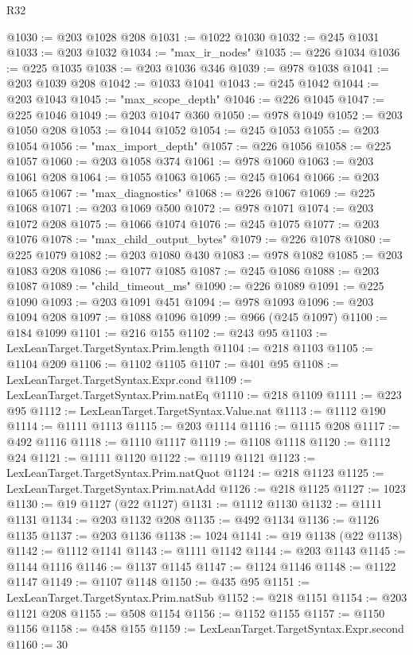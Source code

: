 \begin{lexlean}{R32}
\begin{coremodule}
@1030 := @203 @1028 @208
@1031 := @1022 @1030
@1032 := @245 @1031
@1033 := @203 @1032
@1034 := "max_ir_nodes"
@1035 := @226 @1034
@1036 := @225 @1035
@1038 := @203 @1036 @346
@1039 := @978 @1038
@1041 := @203 @1039 @208
@1042 := @1033 @1041
@1043 := @245 @1042
@1044 := @203 @1043
@1045 := "max_scope_depth"
@1046 := @226 @1045
@1047 := @225 @1046
@1049 := @203 @1047 @360
@1050 := @978 @1049
@1052 := @203 @1050 @208
@1053 := @1044 @1052
@1054 := @245 @1053
@1055 := @203 @1054
@1056 := "max_import_depth"
@1057 := @226 @1056
@1058 := @225 @1057
@1060 := @203 @1058 @374
@1061 := @978 @1060
@1063 := @203 @1061 @208
@1064 := @1055 @1063
@1065 := @245 @1064
@1066 := @203 @1065
@1067 := "max_diagnostics"
@1068 := @226 @1067
@1069 := @225 @1068
@1071 := @203 @1069 @500
@1072 := @978 @1071
@1074 := @203 @1072 @208
@1075 := @1066 @1074
@1076 := @245 @1075
@1077 := @203 @1076
@1078 := "max_child_output_bytes"
@1079 := @226 @1078
@1080 := @225 @1079
@1082 := @203 @1080 @430
@1083 := @978 @1082
@1085 := @203 @1083 @208
@1086 := @1077 @1085
@1087 := @245 @1086
@1088 := @203 @1087
@1089 := "child_timeout_ms"
@1090 := @226 @1089
@1091 := @225 @1090
@1093 := @203 @1091 @451
@1094 := @978 @1093
@1096 := @203 @1094 @208
@1097 := @1088 @1096
@1099 := @966 (@245 @1097)
@1100 := @184 @1099
@1101 := @216 @155
@1102 := @243 @95
@1103 := LexLeanTarget.TargetSyntax.Prim.length
@1104 := @218 @1103
@1105 := @1104 @209
@1106 := @1102 @1105
@1107 := @401 @95
@1108 := LexLeanTarget.TargetSyntax.Expr.cond
@1109 := LexLeanTarget.TargetSyntax.Prim.natEq
@1110 := @218 @1109
@1111 := @223 @95
@1112 := LexLeanTarget.TargetSyntax.Value.nat
@1113 := @1112 @190
@1114 := @1111 @1113
@1115 := @203 @1114
@1116 := @1115 @208
@1117 := @492 @1116
@1118 := @1110 @1117
@1119 := @1108 @1118
@1120 := @1112 @24
@1121 := @1111 @1120
@1122 := @1119 @1121
@1123 := LexLeanTarget.TargetSyntax.Prim.natQuot
@1124 := @218 @1123
@1125 := LexLeanTarget.TargetSyntax.Prim.natAdd
@1126 := @218 @1125
@1127 := 1023
@1130 := @19 @1127 (@22 @1127)
@1131 := @1112 @1130
@1132 := @1111 @1131
@1134 := @203 @1132 @208
@1135 := @492 @1134
@1136 := @1126 @1135
@1137 := @203 @1136
@1138 := 1024
@1141 := @19 @1138 (@22 @1138)
@1142 := @1112 @1141
@1143 := @1111 @1142
@1144 := @203 @1143
@1145 := @1144 @1116
@1146 := @1137 @1145
@1147 := @1124 @1146
@1148 := @1122 @1147
@1149 := @1107 @1148
@1150 := @435 @95
@1151 := LexLeanTarget.TargetSyntax.Prim.natSub
@1152 := @218 @1151
@1154 := @203 @1121 @208
@1155 := @508 @1154
@1156 := @1152 @1155
@1157 := @1150 @1156
@1158 := @458 @155
@1159 := LexLeanTarget.TargetSyntax.Expr.second
@1160 := 30

\end{coremodule}
\end{lexlean}
